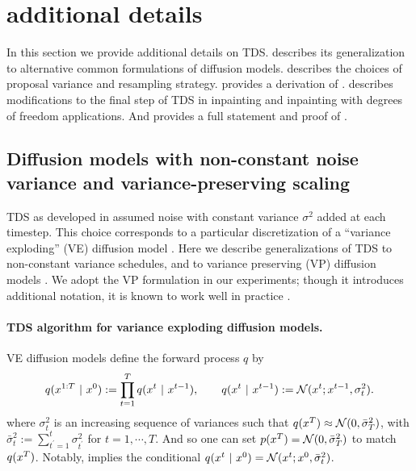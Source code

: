 \section{\methodname{} additional details}\label{sec:supp_method}
In this section we provide additional details on TDS.
 describes its generalization to alternative common formulations of diffusion models.
 describes the choices of proposal variance and resampling strategy.
 provides a derivation of .
 describes modifications to the final step of TDS in inpainting and inpainting with degrees of freedom applications.
And  provides a full statement and proof of .


\subsection{Diffusion models with non-constant noise variance and variance-preserving scaling}\label{sec:VP_VE_TDS}
TDS as developed in  assumed noise with constant variance $\sigma^2$ added at each timestep.
This choice corresponds to a particular discretization of a ``variance exploding'' (VE) diffusion model \citep{song2020score}.
Here we describe generalizations of TDS to non-constant variance schedules,
and to variance preserving (VP) diffusion models \citep{ho2020denoising}.
We adopt the VP formulation in our experiments;
though it introduces additional notation, it is known to work well in practice \citep{song2020score}.

\paragraph{TDS algorithm for variance exploding diffusion models.}
VE diffusion models define the forward process $q$ by 
\begin{align}\label{eq:VE-forward-q}
    q(x^{1:T} ~\vert~ x^{0}) := \prod_{t=1}^T q(x^{t} ~\vert~ x^{t-1}), \qquad q(x^{t} ~\vert~ x^{t-1}) := \mathcal{N}(x^{t}; x^{t-1}, \sigma_t^2). 
\end{align}
where $\sigma_t^2$ is an increasing sequence of variances such that $q(x^{T}) \approx \mathcal{N}(0,\bar \sigma_T^2)$, with  $\bar \sigma_t^2 :=\sum_{t^\prime=1}^t \sigma_{t^\prime}^2$ for $t=1,\cdots, T$.  And so one can set $p(x^{T}) =  \mathcal{N}(0,\bar \sigma_T^2)$ to match $q(x^{T})$.
Notably,  implies the conditional $q(x^{t} ~\vert~ x^{0}) = \mathcal{N}(x^{t}; x^{0}, \bar\sigma_t^2)$. 

